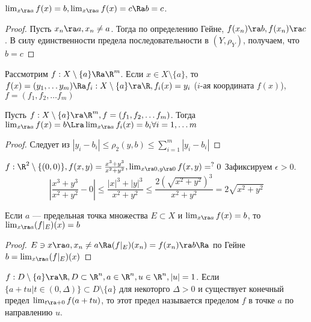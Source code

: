 \begin{proposition}
    \(\lim_{x \ra a} f(x) = b, \lim_{x \ra a} f(x) = c \Ra b = c\).
\end{proposition}
\begin{proof}
    Пусть \(x_n \ra a, x_n \ne a\). Тогда по определению Гейне, \(f(x_n) \ra b, f(x_n) \ra c\). В силу единственности предела последовательности в \((Y, \rho_Y)\), получаем, что \(b = c\)
\end{proof}

Рассмотрим \(f: X \setminus\{a\} \Ra \R^m\). Если \(x \in X \setminus \{a\}\), то \(f(x) = (y_1, \dots y_m) \Ra f_i: X\setminus\{a\} \ra \R, f_i(x) = y_i\) (\(i\)-ая координата \(f(x)\)), \(f = (f_1, f_2, \dots f_m)\)

\begin{lemma}
    Пусть \(f: X \setminus \{a\} \ra \R^m, f = (f_1, f_2, \dots f_m)\). Тогда \(\lim_{x \ra a} f(x) = b \Lra \lim_{x \ra a}f_i(x) = b_i \forall i = 1, \dots m\)
\end{lemma}
\begin{proof}
    Следует из \(|y_i - b_i| \le \rho_2(y, b) \le \sum_{i = 1}^m |y_i - b_i|\)
\end{proof}

\begin{example}
    \(f: \R^2 \setminus\{(0, 0)\}, f(x, y) = \frac{x^3 + y^3}{x^2 + y^2}, \lim_{x \ra 0, y \ra 0} f(x, y) =^? 0\)
    Зафиксируем \(\epsilon > 0\).
    \[\left|\frac{x^3 + y^3}{x^2 + y^2} - 0\right| \le \frac{|x|^3 + |y|^3}{x^2 + y^2} \le \frac{2(\sqrt{x^2 + y^2})^3}{x^2 + y^2} = 2\sqrt{x^2 + y^2}\]
\end{example}

\begin{proposition}
    Если \(a\) --- предельная точка множества \(E \subset X\) и \(\lim_{x \ra a} f(x) = b\), то \(\lim_{x \ra a} (f|_E)(x) = b\)
\end{proposition}
\begin{proof}
    \(E \ni x \ra a, x_n \ne a \Ra (f|_E)(x_n) = f(x_n) \ra b \Ra\) по Гейне \(b = \lim_{x \ra a} (f|_E)(x)\)
\end{proof}

\begin{definition}
    \(f: D\setminus \{a\} \ra \R, D \subset \R^n, a \in \R^n, u \in \R^n, |u| = 1\). Если \(\{a + tu | t \in (0, \Delta)\} \subset D \setminus \{a\}\) для некоторго \(\Delta > 0\) и существует конечный предел \(\lim_{t \ra +0} f(a + tu)\), то этот предел называется пределом \(f\) в точке \(a\) по направлению \(u\).
\end{definition}

